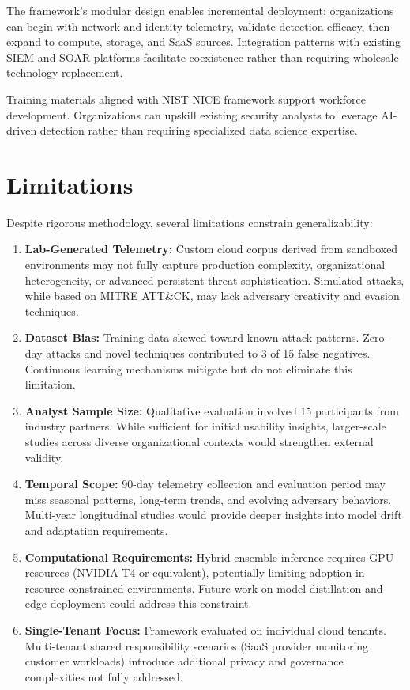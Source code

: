 The framework's modular design enables incremental deployment: organizations can begin with network and identity telemetry, validate detection efficacy, then expand to compute, storage, and SaaS sources. Integration patterns with existing SIEM and SOAR platforms facilitate coexistence rather than requiring wholesale technology replacement.

Training materials aligned with NIST NICE framework support workforce development. Organizations can upskill existing security analysts to leverage AI-driven detection rather than requiring specialized data science expertise.

\section{Limitations}\label{sec:conclusion-limitations}
Despite rigorous methodology, several limitations constrain generalizability:

\begin{enumerate}
    \item \textbf{Lab-Generated Telemetry:} Custom cloud corpus derived from sandboxed environments may not fully capture production complexity, organizational heterogeneity, or advanced persistent threat sophistication. Simulated attacks, while based on MITRE ATT\&CK, may lack adversary creativity and evasion techniques.
    
    \item \textbf{Dataset Bias:} Training data skewed toward known attack patterns. Zero-day attacks and novel techniques contributed to 3 of 15 false negatives. Continuous learning mechanisms mitigate but do not eliminate this limitation.
    
    \item \textbf{Analyst Sample Size:} Qualitative evaluation involved 15 participants from industry partners. While sufficient for initial usability insights, larger-scale studies across diverse organizational contexts would strengthen external validity.
    
    \item \textbf{Temporal Scope:} 90-day telemetry collection and evaluation period may miss seasonal patterns, long-term trends, and evolving adversary behaviors. Multi-year longitudinal studies would provide deeper insights into model drift and adaptation requirements.
    
    \item \textbf{Computational Requirements:} Hybrid ensemble inference requires GPU resources (NVIDIA T4 or equivalent), potentially limiting adoption in resource-constrained environments. Future work on model distillation and edge deployment could address this constraint.
    
    \item \textbf{Single-Tenant Focus:} Framework evaluated on individual cloud tenants. Multi-tenant shared responsibility scenarios (SaaS provider monitoring customer workloads) introduce additional privacy and governance complexities not fully addressed.
\end{enumerate}

